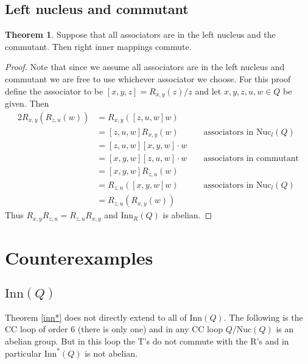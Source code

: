 \documentclass[12pt, twoside, openright]{report}
\theoremstyle{definition}
\newtheorem{thm}{Theorem}[chapter]
\newcommand{\nuc}{\text{Nuc}}       %
\newcommand{\inn}{\text{Inn}}       %
\begin{document}
\subsection{Left nucleus and commutant}

\begin{thm}
  Suppose that all associators are in the left nucleus and the commutant. Then right inner
    mappings commute.
\end{thm}

\begin{proof}
  Note that since we assume all associators are in the left nucleus and commutant we are free
    to use whichever associator we choose. For this proof define the associator to be
    $[x,y,z] = R_{x,y}(z)/z$ and let $x, y, z, u, w\in Q$ be given. Then
  \begin{alignat*}{2}
    R_{x,y}(R_{z,u}(w)) &= R_{x,y}([z,u,w] w) &&\\
    &= [z,u,w] R_{x,y}(w) &&\text{ associators in $\nuc_l(Q)$}\\
    &= [z,u,w] [x,y,w]\cdot w &&\\
    &= [x,y,w] [z,u,w] \cdot w &&\text{ associators in commutant}\\
    &= [x,y,w] R_{z,u}(w) &&\\
    &= R_{z,u}([x,y,w] w) &&\text{ associators in $\nuc_l(Q)$}\\
    &= R_{z,u}(R_{x,y}(w)) &&
  \end{alignat*}
  Thus $R_{x, y}R_{z, u} = R_{z, u}R_{x, y}$ and $\inn_R(Q)$ is abelian.
\end{proof}



\section{Counterexamples}

\subsection{$\inn(Q)$}
Theorem \ref{inn*} does not directly extend to all of $\inn(Q)$. The following is the CC
  loop of order 6 (there is only one) and in any CC loop $Q/\nuc(Q)$ is an abelian group.
  But in this loop the T's do not commute with the R's and in particular $\inn^*(Q)$ is
  not abelian.
\end{document}
